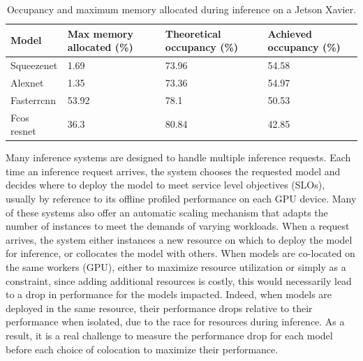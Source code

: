 \begin{table}
	\centering
	\begin{tabular}{p{1.5cm}p{1.5cm}p{2cm}p{2cm}}
		\toprule
		\textbf{Model} & \textbf{Max memory allocated (\%)} & \textbf{Theoretical occupancy (\%)} & \textbf{Achieved occupancy (\%)} \\
		\midrule
		Squeezenet     & 1.69                               & 73.96                               & 54.58                            \\
		Alexnet        & 1.35                               & 73.36                               & 54.97                            \\
		Fasterrcnn     & 53.92                              & 78.1                                & 50.53                            \\
		Fcos resnet    & 36.3                               & 80.84                               & 42.85                            \\
		\bottomrule
	\end{tabular}
	\caption{Occupancy and maximum memory allocated during inference on a Jetson Xavier.}
\end{table}




Many inference systems are designed to handle multiple inference requests. Each time an inference request arrives, the system chooses the requested model and decides where to deploy the model to meet service level objectives (SLOs), usually by reference to its offline profiled performance on each GPU device. Many of these systems also offer an automatic scaling mechanism that adapts the number of instances to meet the demands of varying workloads. When a request arrives, the system either instances a new resource on which to deploy the model for inference, or collocates the model with others. When models are co-located on the same workers (GPU), either to maximize resource utilization or simply as a constraint, since adding additional resources is costly, this would necessarily lead to a drop in performance for the models impacted. Indeed, when models are deployed in the same resource, their performance drops relative to their performance when isolated, due to the race for resources during inference. As a result, it is a real challenge to measure the performance drop for each model before each choice of colocation to maximize their performance.

